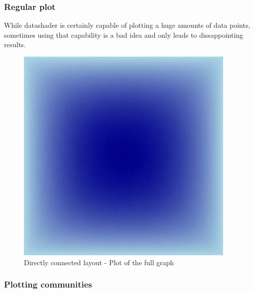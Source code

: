 \documentclass[12pt, a4paper]{article}
\begin{document}
\subsubsection{Regular plot}




While datashader is certainly capable of plotting a huge amounts of data points, sometimes using that capability is a bad idea and only leads to dissappointing results.

\begin{figure}
    \centering
    \includegraphics[width=\textwidth]{src/youtube/datashader/simple/fullgraph}
    \caption{Directly connected layout - Plot of the full graph}
    \label{fig:ds_fullgraph}
\end{figure}

\subsubsection{Plotting communities}
\end{document}
